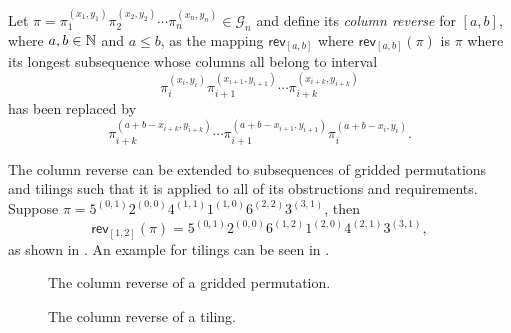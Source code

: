 \begin{definition}\label{def:rrgp}
Let $\pi=\pi_1^{(x_1,y_1)}\pi_2^{(x_2,y_2)}\dotsm\pi_n^{(x_n,y_n)} \in \mathcal{G}_n$ and define its \emph{column reverse} for $[a,b]$, where $a,b\in\mathbb{N}$ and $a\leq b$, as the mapping $\textsf{rev}_{[a,b]}$ where $\textsf{rev}_{[a,b]}(\pi)$ is $\pi$ where its longest subsequence whose columns all belong to interval
\[
\pi_{i}^{(x_i,y_i)}\pi_{i+1}^{(x_{i+1},y_{i+1})}\dotsm\pi_{i+k}^{(x_{i+k},y_{i+k})}
\]
has been replaced by 
\[
    \pi_{i+k}^{(a+b-x_{i+k},y_{i+k})}\dotsm\pi_{i+1}^{(a+b-x_{i+1},y_{i+1})}\pi_{i}^{(a+b-x_i,y_i)}.
\]
\end{definition}

The column reverse can be extended to subsequences of gridded permutations and tilings such that it is applied to all of its obstructions and requirements. Suppose $\pi = 5^{(0,1)}2^{(0,0)}4^{(1,1)}1^{(1,0)}6^{(2,2)}3^{(3,1)}$, then 
\[
\textsf{rev}_{[1,2]}(\pi) = 5^{(0,1)}2^{(0,0)}6^{(1,2)}1^{(2,0)}4^{(2,1)}3^{(3,1)},
\]
as shown in . An example for tilings can be seen in .

\begin{figure}[htbp]
    \centering
    
    \caption{The column reverse of a gridded permutation.}
    \label{fig:gp_col_rev}
\end{figure}

\begin{figure}[htbp]
    \centering
    
    \caption{The column reverse of a tiling.}
    \label{fig:t_col_rev}
\end{figure}


